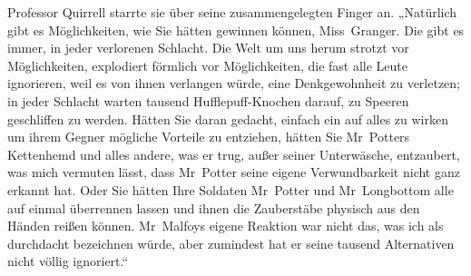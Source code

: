 Professor Quirrell starrte sie über seine zusammengelegten Finger an. „Natürlich gibt es Möglichkeiten, wie Sie hätten gewinnen können, Miss~Granger. Die gibt es immer, in jeder verlorenen Schlacht. Die Welt um uns herum strotzt vor Möglichkeiten, explodiert förmlich vor Möglichkeiten, die fast alle Leute ignorieren, weil es von ihnen verlangen würde, eine Denkgewohnheit zu verletzen; in jeder Schlacht warten tausend Hufflepuff-Knochen darauf, zu Speeren geschliffen zu werden. Hätten Sie daran gedacht, einfach ein  auf alles zu wirken um ihrem Gegner mögliche Vorteile zu entziehen, hätten Sie Mr~Potters Kettenhemd und alles andere, was er trug, außer seiner Unterwäsche, entzaubert, was mich vermuten lässt, dass Mr~Potter seine eigene Verwundbarkeit nicht ganz erkannt hat. Oder Sie hätten Ihre Soldaten Mr~Potter und Mr~Longbottom alle auf einmal überrennen lassen und ihnen die Zauberstäbe physisch aus den Händen reißen können. Mr~Malfoys eigene Reaktion war nicht das, was ich als durchdacht bezeichnen würde, aber zumindest hat er seine tausend Alternativen nicht völlig ignoriert.“
